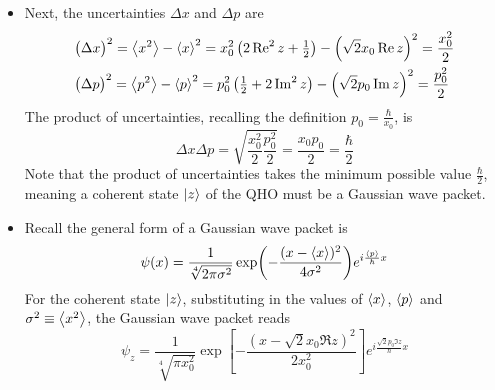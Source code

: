 \documentclass[11pt, a4paper]{article}
\begin{document}
\begin{itemize}
	\item Next, the uncertainties $ \Delta x $ and $ \Delta p $ are
	\begin{align*}
		&\big(\Delta x\big)^{2} = \ev{x^{2}} - \ev{x}^{2} = x_{0}^{2}\left(2 \Re^{2}z + \tfrac{1}{2}\right) - \left(\sqrt{2}x_{0}\Re z\right)^{2} = \frac{x_{0}^{2}}{2}\\
		&\big(\Delta p\big)^{2} = \ev{p^{2}} - \ev{p}^{2} = p_{0}^{2}\left(\tfrac{1}{2} + 2 \Im^{2}z\right) - \left(\sqrt{2}p_{0}\Im z\right)^{2} = \frac{p_{0}^{2}}{2}\\
	\end{align*}
	The product of uncertainties, recalling the definition $ p_{0} = \frac{\hbar}{x_{0}} $, is 
	\begin{equation*}
		\Delta x \Delta p = \sqrt{\frac{x_{0}^{2}}{2}\frac{p_{0}^{2}}{2}} = \frac{x_{0}p_{0}}{2} = \frac{\hbar}{2}
	\end{equation*}
	Note that the product of uncertainties takes the minimum possible value $ \frac{\hbar}{2} $, meaning a coherent state $ \ket{z} $ of the QHO must be a Gaussian wave packet. 
	
	\item Recall the general form of a Gaussian wave packet is
	\begin{equation*}
		\psi(x) = \frac{1}{\sqrt[4]{2\pi\sigma^{2}}}\exp(-\frac{(x-\ev{x})^{2}}{4\sigma^{2}})e^{i \frac{\ev{p}}{\hbar}x}
	\end{equation*}
	For the coherent state $ \ket{z} $, substituting in the values of $ \ev{x} $, $ \ev{p} $ and $ \sigma^{2} \equiv \ev{x^{2}} $, the Gaussian wave packet reads
	\begin{equation*}
		\psi_{z} = \frac{1}{\sqrt[4]{\pi x_{0}^{2}}}\exp\left[-\frac{\left(x-\sqrt{2}x_{0}\Re z\right)^{2}}{2x_{0}^{2}}\right]e^{i \frac{\sqrt{2}p_{0}\Im z}{\hbar}x}
	\end{equation*}
	

\end{itemize}
\end{document}
